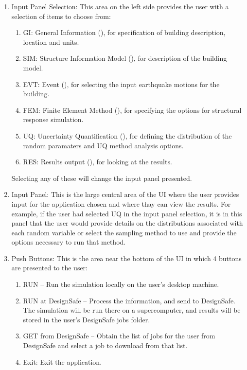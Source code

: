 \begin{enumerate}
\item Input Panel Selection: This area on the left side provides the
  user with a selection of items to choose from:
\begin{enumerate}
  \item GI: General Information (), for specification of building
    description, location and units.
  \item SIM: Structure Information Model (), for description of the
    building model.
  \item EVT: Event (), for selecting the input earthquake motions for the building.
  \item FEM: Finite Element Method (), for specifying the options for structural response simulation.
  \item UQ: Uncertainty Quantification (), for defining the distribution
    of the random paramaters and UQ method analysis options.


  \item RES: Results output (), for looking at the results.
\end{enumerate}

Selecting any of these will change the input panel presented.

\item Input Panel: This is the large central area of the UI where the
  user provides input for the application chosen and where thay can view the
  results. For example, if the user had selected UQ in the input panel
  selection, it is in this panel that the user would provide details
  on the distributions associated with each random variable or select
  the sampling method to use and provide the options necessary to run
  that method.

\item Push Buttons: This is the area near the bottom of the UI in
  which 4 buttons are presented to the user:

\begin{enumerate}
\item RUN – Run the simulation locally on the user’s desktop machine.
\item RUN at DesignSafe – Process the information, and send to
  DesignSafe. The simulation will be run there on a supercomputer, and results
  will be stored in the user's DesignSafe jobs folder.
\item GET from DesignSafe – Obtain the list of
  jobs for the user from DesignSafe and select a job to download from that list.
\item Exit: Exit the application.
\end{enumerate}


\end{enumerate}
